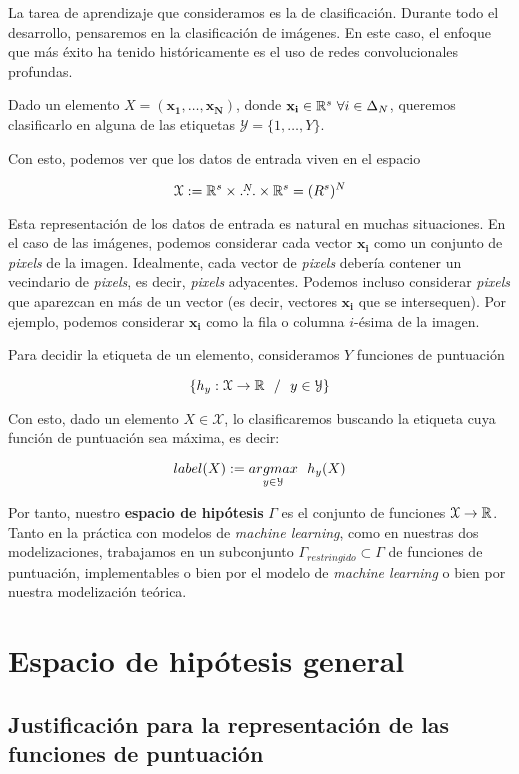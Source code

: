 La tarea de aprendizaje que consideramos es la de clasificación. Durante todo el desarrollo, pensaremos en la clasificación de imágenes. En este caso, el enfoque que más éxito ha tenido históricamente es el uso de redes convolucionales profundas.

Dado un elemento $X = (\mathbf{x_1}, \ldots, \mathbf{x_N})$, donde $\mathbf{x_i} \in \mathbb{R}^s \ \forall i \in \Delta_{N}$, queremos clasificarlo en alguna de las etiquetas $\mathcal{Y} = \{1, \ldots, Y \}$.

Con esto, podemos ver que los datos de entrada viven en el espacio

$$\mathcal{X} := \mathbb{R}^s \times \overset{N}{\ldots} \times \mathbb{R}^s = (R^s)^N$$

Esta representación de los datos de entrada es natural en muchas situaciones. En el caso de las imágenes, podemos considerar cada vector $\mathbf{x_i}$ como un conjunto de \textit{pixels} de la imagen. Idealmente, cada vector de \textit{pixels} debería contener un vecindario de \textit{pixels}, es decir, \textit{pixels} adyacentes. Podemos incluso considerar \textit{pixels} que aparezcan en más de un vector (es decir, vectores $\mathbf{x_i}$ que se intersequen). Por ejemplo, podemos considerar $\mathbf{x_i}$ como la fila o columna $i$-ésima de la imagen.

Para decidir la etiqueta de un elemento, consideramos $Y$ funciones de puntuación

$$\{h_y: \mathcal{X} \to \mathbb{R} \ \  / \ \  y \in \mathcal{Y} \}$$

Con esto, dado un elemento $X \in \mathcal{X}$, lo clasificaremos buscando la etiqueta cuya función de puntuación sea máxima, es decir:

$$label(X) := \underset{y \in \mathcal{Y}}{argmax} \ \  h_y(X)$$

Por tanto, nuestro \textbf{espacio de hipótesis} $\Gamma$ es el conjunto de funciones $\mathcal{X} \to \mathbb{R}$. Tanto en la práctica con modelos de \textit{machine learning}, como en nuestras dos modelizaciones, trabajamos en un subconjunto $\Gamma_{restringido} \subset \Gamma$ de funciones de puntuación, implementables o bien por el modelo de \textit{machine learning} o bien por nuestra modelización teórica.

\section{Espacio de hipótesis general}

\subsection{Justificación para la representación de las funciones de puntuación} \label{sec:justificacion_func_repr}

